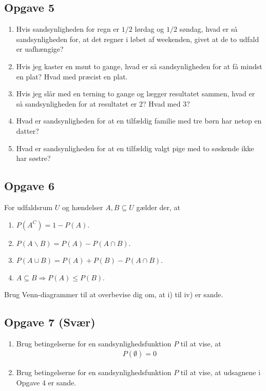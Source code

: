 \subsection*{Opgave 5}
\begin{enumerate}[label=\roman*)]
\item Hvis sandsynligheden for regn er $1/2$ lørdag og $1/2$ søndag, hvad er så sandsynligheden for, at det regner i løbet af weekenden, givet at de to udfald er uafhængige?
\item Hvis jeg kaster en mønt to gange, hvad er så sandsynligheden for at få mindst en plat? Hvad med præcist en plat.
\item Hvis jeg slår med en terning to gange og lægger resultatet sammen, hvad er så sandsynligheden for at resultatet er $2$? Hvad med $3$?
\item Hvad er sandsynligheden for at en tilfældig familie med tre børn har netop en datter?
\item Hvad er sandsynligheden for at en tilfældig valgt pige med to søskende ikke har søstre?
\end{enumerate}

\subsection*{Opgave 6}
For udfaldsrum $U$ og hændelser $A,B\subseteq U$ gælder der, at 
\begin{enumerate}[label=\roman*)]
\item $P(A^C) = 1-P(A)$.
\item $P(A \backslash B) = P(A) - P(A\cap B)$.
\item $P(A\cup B) = P(A)+P(B)-P(A\cap B)$.
\item $A\subseteq B \Rightarrow P(A)\leq P(B).$ 
\end{enumerate}
Brug Venn-diagrammer til at overbevise dig om, at i) til iv) er sande.


\subsection*{Opgave 7 (Svær)}

\begin{enumerate}[label=\roman*)]
	\item Brug betingelserne for en sandsynlighedsfunktion $P$ til at vise, at 
	\begin{align*}
		P(\emptyset) = 0
	\end{align*}
	\item Brug betingelserne for en sandsynlighedsfunktion $P$ til at vise, at udsagnene i Opgave 4 er sande. 
\end{enumerate}
